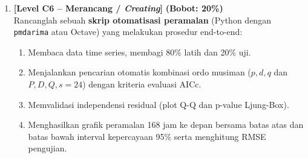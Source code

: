 \documentclass[11pt,a4paper]{article}
\begin{document}
\begin{enumerate}[leftmargin=1.5em, label=\textbf{Soal \arabic*.}]
    \vspace{0.4cm}

    \item \textbf{[Level C6 -- Merancang / \textit{Creating}]} \hfill \textbf{(Bobot: 20\%)} \\
    Rancanglah sebuah \textbf{skrip otomatisasi peramalan} (Python dengan \texttt{pmdarima} atau Octave) yang melakukan prosedur end-to-end:
    \begin{enumerate}[label=\alph*.]
        \item Membaca data time series, membagi 80\% latih dan 20\% uji.
        \item Menjalankan pencarian otomatis kombinasi ordo musiman ($p,d,q$ dan $P,D,Q,s=24$) dengan kriteria evaluasi AICc.
        \item Memvalidasi independensi residual (plot Q-Q dan p-value Ljung-Box).
        \item Menghasilkan grafik peramalan 168 jam ke depan bersama batas atas dan batas bawah interval kepercayaan 95\% serta menghitung RMSE pengujian.
    \end{enumerate}

\end{enumerate}
\end{document}
